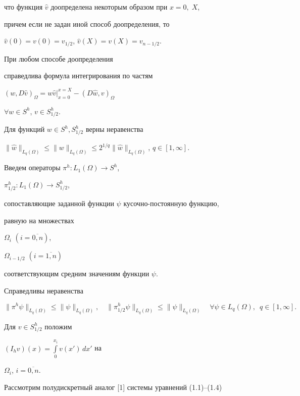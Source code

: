 что функция $\widehat v$ доопределена некоторым образом при $x=0,\;X$,


причем если не задан иной способ доопределения, то


$\widehat v(0)=v(0)= v_{1/2}$, $\widehat v(X)=v(X)= v_{n-1/2}$.


При любом способе доопределения


справедлива формула интегрирования по частям


$(w, D\widehat v)_\Omega = w\widehat v|_{x=0}^{x=X}


- (D\widehat w,v)_\Omega$


$\forall w\in S^h$, $v\in S^h_{1/2}.$


Для функций $w\in S^h, S^h_{1/2}$ верны неравенства


$


\|\widehat w\|_{L_q(\Omega)}\le \|w\|_{L_q(\Omega)}\le


2^{1/q} \|\widehat w\|_{L_q(\Omega)}$, $q\in [1,\infty].$





Введем операторы $\pi^h: L_1(\Omega)\to S^h$,


$\pi^h_{1/2}: L_1(\Omega)\to S^h_{1/2}$,


сопоставляющие заданной функции $\psi$ кусочно-постоянную функцию,


равную на множествах


$\Omega_{i}$ $(i=\overline{0,n})$,


$\Omega_{i-1/2}$ $(i=\overline{1,n})$


соответствующим средним значениям функции $\psi$.


Справедливы неравенства


$$


\|\pi^h\psi\|_{L_q(\Omega)}\le \|\psi\|_{L_q(\Omega)},\quad


\|\pi^h_{1/2}\psi\|_{L_q(\Omega)}\le \|\psi\|_{L_q(\Omega)}\quad


\forall \psi\in L_q(\Omega),\ \; q\in [1,\infty].


$$


Для $v\in S^h_{1/2}$ положим


$(I_hv)(x)=\int\limits_0^{x_i}v(x')\,dx'$ на


$\Omega_i$, $i=\overline{0,n}$.





Рассмотрим полудискретный аналог [1] системы уравнений (1.1)--(1.4)


